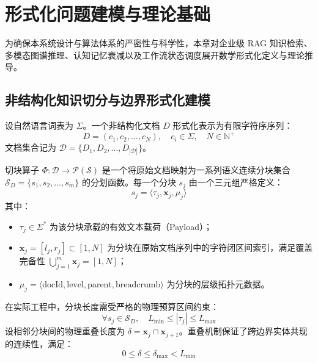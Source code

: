 
\chapter{形式化问题建模与理论基础}

为确保本系统设计与算法体系的严密性与科学性，本章对企业级 RAG 知识检索、多模态图谱推理、认知记忆衰减以及工作流状态调度展开数学形式化定义与理论推导。

\section{非结构化知识切分与边界形式化建模}

\begin{definition}[非结构化文档空间]
    设自然语言词表为 $\Sigma$。一个非结构化文档 $D$ 形式化表示为有限字符序序列：
    \begin{equation}
        D = (c_1, c_2, \ldots, c_N), \quad c_i \in \Sigma, \quad N \in \mathbb{N}^+
    \end{equation}
    文档集合记为 $\mathcal{D} = \{D_1, D_2, \ldots, D_{|\mathcal{D}|}\}$。
\end{definition}

\begin{definition}[语义切块算子与信息边界约束]
    切块算子 $\Phi: \mathcal{D} \rightarrow \mathcal{P}(\mathcal{S})$ 是一个将原始文档映射为一系列语义连续分块集合 $\mathcal{S}_D = \{s_1, s_2, \ldots, s_m\}$ 的分划函数。每一个分块 $s_j$ 由一个三元组严格定义：
    \begin{equation}
        s_j = \langle \tau_j, \mathbf{x}_j, \mu_j \rangle
    \end{equation}
    其中：
    \begin{itemize}
        \item $\tau_j \in \Sigma^*$ 为该分块承载的有效文本载荷（Payload）；
        \item $\mathbf{x}_j = [l_j, r_j] \subset [1, N]$ 为分块在原始文档序列中的字符闭区间索引，满足覆盖完备性 $\bigcup_{j=1}^m \mathbf{x}_j = [1, N]$；
        \item $\mu_j = \langle \text{docId}, \text{level}, \text{parent}, \text{breadcrumb} \rangle$ 为分块的层级拓扑元数据。
    \end{itemize}
\end{definition}

在实际工程中，分块长度需受严格的物理预算区间约束：
\begin{equation}
    \forall s_j \in \mathcal{S}_D, \quad L_{\min} \le |\tau_j| \le L_{\max}
\end{equation}
设相邻分块间的物理重叠长度为 $\delta = \mathbf{x}_j \cap \mathbf{x}_{j+1}$。重叠机制保证了跨边界实体共现的连续性，满足：
\begin{equation}
    0 \le \delta \le \delta_{\max} < L_{\min}
\end{equation}

